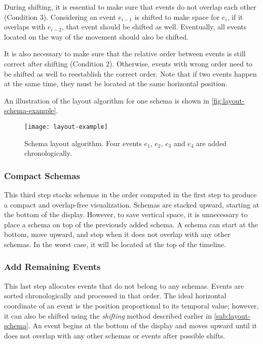 During shifting, it is essential to make sure that events do not overlap each other (Condition 3). Considering an event $e_{i-1}$ is shifted to make space for $e_i$, if it overlaps with $e_{i-2}$, that event should be shifted as well. Eventually, all events located on the way of the movement should also be shifted.

It is also necessary to make sure that the relative order between events is still correct after shifting (Condition 2). Otherwise, events with wrong order need to be shifted as well to reestablish the correct order. Note that if two events happen at the same time, they must be located at the same horizontal position. 

An illustration of the layout algorithm for one schema is shown in \autoref{fig:layout-schema-example}.

\begin{figure}[!htb]
	\centering
	\texttt{[image: layout-example]}
	\caption{Schema layout algorithm. Four events $e_1$, $e_2$, $e_3$ and $e_4$ are added chronologically.}
	\label{fig:layout-schema-example}
\end{figure}

\subsubsection{Compact Schemas}
This third step stacks schemas in the order computed in the first step to produce a compact and overlap-free visualization. Schemas are stacked upward, starting at the bottom of the display. However, to save vertical space, it is unnecessary to place a schema on top of the previously added schema. A schema can start at the bottom, move upward, and stop when it does not overlap with any other schemas. In the worst case, it will be located at the top of the timeline.

\subsubsection{Add Remaining Events}
This last step allocates events that do not belong to any schemas. Events are sorted chronologically and processed in that order. The ideal horizontal coordinate of an event is the position proportional to its temporal value; however, it can also be shifted using the \emph{shifting} method described earlier in \autoref{sub:layout-schema}. An event begins at the bottom of the display and moves upward until it does not overlap with any other schemas or events after possible shifts. 

